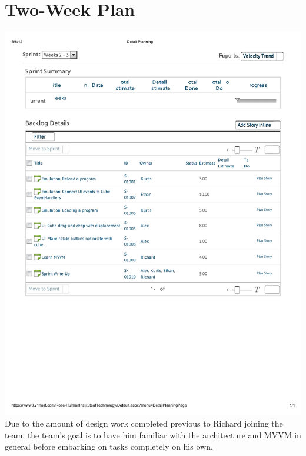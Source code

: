 \documentclass[12pt]{article}
\begin{document}
\section*{Two-Week Plan}
\includegraphics[scale=.75]{pdfs/MS1VersionOne/Sprint.pdf}
Due to the amount of design work completed previous to Richard joining the team, the team's goal is to have him familiar with the architecture and MVVM in general before embarking on tasks completely on his own.
        
\end{document}
